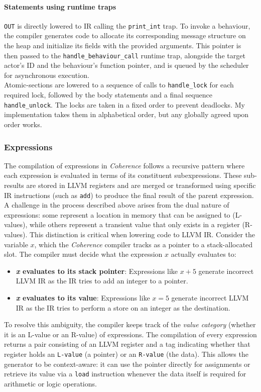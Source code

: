 \documentclass[a4paper,12pt,fleqn]{article}
\begin{document}
\paragraph{Statements using runtime traps\\}
\texttt{OUT} is directly lowered to IR calling the \texttt{print\_int} trap. To invoke a behaviour, the compiler generates code to allocate its corresponding message structure on the heap and initialize its fields with the provided arguments. This pointer is then passed to the \texttt{handle\_behaviour\_call} runtime trap, alongside the target actor's ID and the behaviour's function pointer, and is queued by the scheduler for asynchronous execution.\\
Atomic-sections are lowered to a sequence of calls to \texttt{handle\_lock} for each required lock, followed by the body statements and a final sequence \texttt{handle\_unlock}. The locks are taken in a fixed order to prevent deadlocks. My implementation takes them in alphabetical order, but any globally agreed upon order works.

\subsubsection{Expressions}
The compilation of expressions in \textit{Coherence} follows a recursive pattern where each expression is evaluated in terms of its constituent subexpressions. These sub-results are stored in LLVM registers and are merged or transformed using specific IR instructions (such as \texttt{add}) to produce the final result of the parent expression.\\
A challenge in the process described above arises from the dual nature of expressions: some represent a location in memory that can be assigned to (L-values), while others represent a transient value that only exists in a register (R-values). This distinction is critical when lowering code to LLVM IR. Consider the variable $x$, which the \textit{Coherence} compiler tracks as a pointer to a stack-allocated slot. The compiler must decide what the expression $x$ actually evaluates to:
\begin{itemize}
  \item \textbf{\textit{x} evaluates to its stack pointer}: Expressions like $x + 5$ generate incorrect LLVM IR as the IR tries to add an integer to a pointer.
  \item \textbf{\textit{x} evaluates to its value}: Expressions like $x = 5$ generate incorrect LLVM IR as the IR tries to perform a store on an integer as the destination.
\end{itemize}
To resolve this ambiguity, the compiler keeps track of the \textit{value category} (whether it is an L-value or an R-value) of expressions. The compilation of every expression returns a pair consisting of an LLVM register and a tag indicating whether that register holds an \texttt{L-value} (a pointer) or an \texttt{R-value} (the data). This allows the generator to be context-aware: it can use the pointer directly for assignments or retrieve its value via a \texttt{load} instruction whenever the data itself is required for arithmetic or logic operations.
\end{document}
